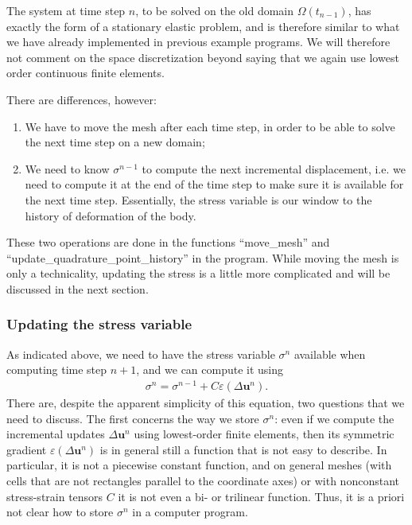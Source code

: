 \documentclass{article}
\renewcommand{\vec}[1]{\mathbf{#1}}
\begin{document}
The system at time step $n$, to be solved on the old domain
$\Omega(t_{n-1})$, has exactly the form of a stationary elastic
problem, and is therefore similar to what we have already implemented
in previous example programs. We will therefore not comment on the
space discretization beyond saying that we again use lowest order
continuous finite elements.

There are differences, however:
\begin{enumerate}
  \item We have to move the mesh after each time step, in order to be
  able to solve the next time step on a new domain;

  \item We need to know $\sigma^{n-1}$ to compute the next incremental
  displacement, i.e. we need to compute it at the end of the time step
  to make sure it is available for the next time step. Essentially,
  the stress variable is our window to the history of deformation of
  the body.
\end{enumerate}
These two operations are done in the functions ``move\_mesh'' and
``update\_\-quadrature\_\-point\_history'' in the program. While moving
the mesh is only a technicality, updating the stress is a little more
complicated and will be discussed in the next section.


\subsubsection*{Updating the stress variable}

As indicated above, we need to have the stress variable $\sigma^n$ available
when computing time step $n+1$, and we can compute it using
\begin{gather*}
  \sigma^n = \sigma^{n-1} + C \varepsilon (\Delta \vec u^n).  
\end{gather*}
There are, despite the apparent simplicity of this equation, two questions
that we need to discuss. The first concerns the way we store $\sigma^n$: even
if we compute the incremental updates $\Delta\vec u^n$ using lowest-order
finite elements, then its symmetric gradient $\varepsilon(\Delta\vec u^n)$ is
in general still a function that is not easy to describe. In particular, it is
not a piecewise constant function, and on general meshes (with cells that are
not rectangles parallel to the coordinate axes) or with nonconstant
stress-strain tensors $C$ it is not even a bi- or trilinear function. Thus, it
is a priori not clear how to store $\sigma^n$ in a computer program.
\end{document}
